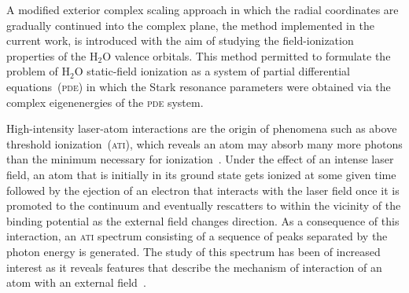 
A modified exterior complex scaling approach in which the radial
coordinates are gradually continued into the complex plane, the method
implemented in the current work, is introduced with the aim of
studying the field-ionization properties of the H$_{2}$O valence
orbitals. This method permitted to formulate the problem of H$_{2}$O
static-field ionization as a system of partial differential
equations~(\textsc{pde}) in which the Stark resonance parameters were
obtained via the complex eigenenergies of the \textsc{pde} system.






High-intensity laser-atom interactions are the origin of phenomena
such as above threshold ionization~(\textsc{ati}), which reveals an
atom may absorb many more photons than the minimum necessary for
ionization~\cite{ATI1979}.
Under the effect of an intense laser field, an atom that is initially
in its ground state gets ionized at some given time followed by the
ejection of an electron that interacts with the laser field once it is
promoted to the continuum and eventually rescatters to within the
vicinity of the binding potential as the external field changes
direction. As a consequence of this interaction, an \textsc{ati}
spectrum consisting of a sequence of peaks separated by the photon
energy is generated. The study of this spectrum has been of increased
interest as it reveals features that describe the mechanism of
interaction of an atom with an external
field~\cite{BeckerRescattering_2018,Becker_ati2002}.

